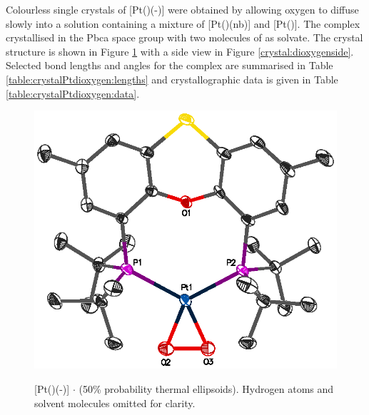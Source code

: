 Colourless single crystals of [Pt(\tButhixantphos)(-)] were obtained by allowing oxygen to diffuse slowly into a  solution containing a mixture of [Pt(\tButhixantphos)(nb)] and [Pt(\tButhixantphos)].  The complex crystallised in the Pbca space group with two molecules of  as solvate.  The crystal structure is shown in Figure \ref{crystal:dioxygen} with a side view in Figure \ref{crystal:dioxygenside}.  Selected bond lengths and angles for the complex are summarised in Table \ref{table:crystalPtdioxygen:lengths} and crystallographic data is given in Table \ref{table:crystalPtdioxygen:data}.  

\begin{figure}[ht]
\begin{center}
\vspace{0.5cm}
\includegraphics{../Figures/Crystalplatinumdioxygen.eps}
\caption[X-ray crystal structure of \texorpdfstring{[Pt(\tButhixantphos)(-){]}} P $\cdot{}$ ]{[Pt(\tButhixantphos)(-)] $\cdot{}$  (50\% probability thermal ellipsoids).  Hydrogen atoms and solvent molecules omitted for clarity.}
\vspace{0.2cm}
\label{crystal:dioxygen}
\end{center}
\end{figure}
\vspace{0.2cm}

